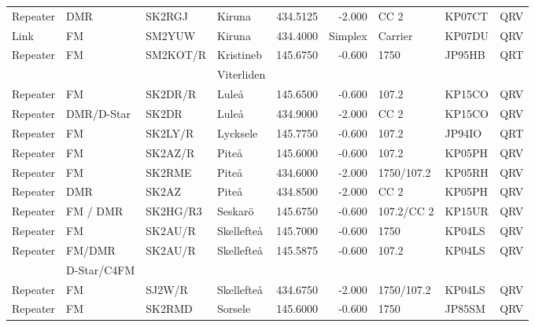 \begin{longtable}{llllrrlll}
Repeater   & DMR         & SK2RGJ    & Kiruna             & 434.5125     & -2.000     & CC 2       & KP07CT      & QRV      \\
Link       & FM          & SM2YUW    & Kiruna             & 434.4000     & Simplex    & Carrier    & KP07DU      & QRV      \\
Repeater   & FM          & SM2KOT/R  & Kristineb          & 145.6750     & -0.600     & 1750       & JP95HB      & QRT      \\
           &             &           & Viterliden         &              &            &            &             &          \\
Repeater   & FM          & SK2DR/R   & Luleå              & 145.6500     & -0.600     & 107.2      & KP15CO      & QRV      \\
Repeater   & DMR/D-Star  & SK2DR     & Luleå              & 434.9000     & -2.000     & CC 2       & KP15CO      & QRV      \\
Repeater   & FM          & SK2LY/R   & Lycksele           & 145.7750     & -0.600     & 107.2      & JP94IO      & QRT      \\
Repeater   & FM          & SK2AZ/R   & Piteå              & 145.6000     & -0.600     & 107.2      & KP05PH      & QRV      \\
Repeater   & FM          & SK2RME    & Piteå              & 434.6000     & -2.000     & 1750/107.2 & KP05RH      & QRV      \\
Repeater   & DMR         & SK2AZ     & Piteå              & 434.8500     & -2.000     & CC 2       & KP05PH      & QRV      \\
Repeater   & FM / DMR    & SK2HG/R3  & Seskarö            & 145.6750     & -0.600     & 107.2/CC 2 & KP15UR      & QRV      \\
Repeater   & FM          & SK2AU/R   & Skellefteå         & 145.7000     & -0.600     & 1750       & KP04LS      & QRV      \\
Repeater   & FM/DMR      & SK2AU/R   & Skellefteå         & 145.5875     & -0.600     & 107.2      & KP04LS      & QRV      \\
           & D-Star/C4FM &           &                    &              &            &            &             &          \\
Repeater   & FM          & SJ2W/R    & Skellefteå         & 434.6750     & -2.000     & 1750/107.2 & KP04LS      & QRV      \\
Repeater   & FM          & SK2RMD    & Sorsele            & 145.6000     & -0.600     & 1750       & JP85SM      & QRV      \\

\end{longtable}
